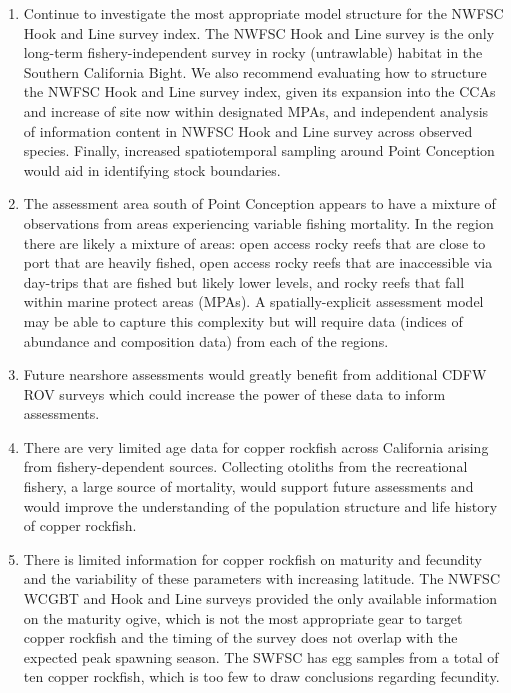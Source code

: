 \documentclass[11pt,
  english,
  letterpaper,
]{article}
\begin{document}
\begin{enumerate}

  \item Continue to investigate the most appropriate model structure for the NWFSC Hook and Line survey index. The NWFSC Hook and Line survey is the only long-term fishery-independent survey in rocky (untrawlable) habitat in the Southern California Bight. We also recommend evaluating how to structure the NWFSC Hook and Line survey index, given its expansion into the CCAs and increase of site now within designated MPAs, and independent analysis of information content in NWFSC Hook and Line survey across observed species. Finally, increased spatiotemporal sampling around Point Conception would aid in identifying stock boundaries.

    \item The assessment area south of Point Conception appears to have a mixture of observations from areas experiencing variable fishing mortality. In the region there are likely a mixture of areas: open access rocky reefs that are close to port that are heavily fished, open access rocky reefs that are inaccessible via day-trips that are fished but likely lower levels, and rocky reefs that fall within marine protect areas (MPAs). A spatially-explicit assessment model may be able to capture this complexity but will require data (indices of abundance and composition data) from each of the regions. 
    
    \item Future nearshore assessments would greatly benefit from additional CDFW ROV surveys which could increase the power of these data to inform assessments.

    \item There are very limited age data for copper rockfish across California arising from fishery-dependent sources.  Collecting otoliths from the recreational fishery, a large source of mortality, would support future assessments and would improve the understanding of the population structure and life history of copper rockfish. 

    \item There is limited information for copper rockfish on maturity and fecundity and the variability of these parameters with increasing latitude.  The NWFSC WCGBT and Hook and Line surveys provided the only available information on the maturity ogive, which is not the most appropriate gear to target copper rockfish and the timing of the survey does not overlap with the expected peak spawning season.  The SWFSC has egg samples from a total of ten copper rockfish, which is too few to draw conclusions regarding fecundity.


\end{enumerate}
\end{document}
